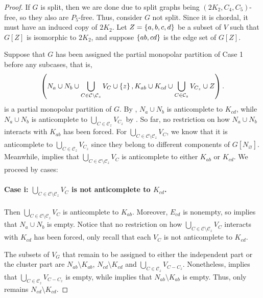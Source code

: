 \begin{proof}
    If $G$ is split, then we are done due to split graphs being
    $(2K_2,C_4,C_5)$-free, so they also are $P_5$-free. Thus, consider $G$ not
    split. Since it is chordal, it must have an induced copy of $2K_2$. Let
    $Z=\left\{a,b,c,d\right\}$ be a subset of $V$ such that $G[Z]$ is isomorphic to $2K_2$,
    and suppose $\left\{ab,cd\right\}$ is the edge set of $G[Z]$.
    
    Suppose that $G$ has been assigned the partial monopolar partition of Case 1
    before any subcases, that is,
    \[
        \left(N_a \cup N_b \cup \bigcup_{C\in\mathcal{C}
        \setminus \mathcal{C}_z} V_C \cup \left\{z\right\} , 
        K_{ab} \cup K_{cd} \cup \bigcup_{C\in \mathcal{C}_z} V_{C_z} \cup Z\right).
    \]
    is a partial monopolar partition of $G$. By ,
    $N_a\cup N_b$ is anticomplete to $K_{cd}$, while $N_a\cup N_b$ is
    anticomplete to $\bigcup_{C\in \mathcal{C}_z} V_{C_z}$ by
    . So far, no restriction on how $N_a \cup N_b$
    interacts with $K_{ab}$ has been forced. For $\bigcup_{C\in\mathcal{C}
    \setminus \mathcal{C}_z} V_C$, we know that it is anticomplete to
    $\bigcup_{C\in \mathcal{C}_z} V_{C_z}$ since they belong to different
    components of $G[N_\varnothing]$. Meanwhile,  implies
    that $\bigcup_{C\in\mathcal{C} \setminus \mathcal{C}_z} V_C$ is anticomplete
    to either $K_{ab}$ or $K_{cd}$. We proceed by cases:

    \paragraph{Case i: $\bigcup_{C\in\mathcal{C}\setminus \mathcal{C}_z} V_C$ is
    not anticomplete to $K_{cd}$.} Then $\bigcup_{C\in\mathcal{C} \setminus
    \mathcal{C}_z} V_C$ is anticomplete to $K_{ab}$. Moreover, $E_{cd}$ is
    nonempty, so  implies that $N_a\cup N_b$ is empty.
    Notice that no restriction on how $\bigcup_{C\in\mathcal{C} \setminus
    \mathcal{C}_z} V_C$ interacts with $K_{cd}$ has been forced, only recall
    that each $V_C$ is not anticomplete to $K_{cd}$.

    The subsets of $V_G$ that remain to be assigned to either the independent
    part or the cluster part are $N_{ab}\setminus K_{ab}$, $N_{cd}\setminus
    K_{cd}$ and $\bigcup_{C\in\mathcal{C}_z} V_{C-C_z}$. Nonetheless,
     implies that $\bigcup_{C\in\mathcal{C}_z} V_{C-C_z}$
    is empty, while  implies that $N_{ab}\setminus
    K_{ab}$ is empty. Thus, only remains $N_{cd}\setminus K_{cd}$.


\end{proof}
